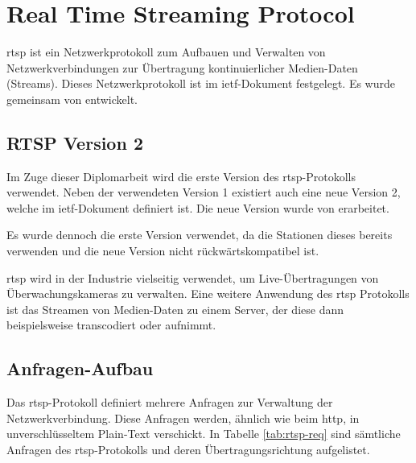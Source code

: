 \section{Real Time Streaming Protocol}
\ac{rtsp} ist ein Netzwerkprotokoll zum Aufbauen und Verwalten von Netzwerkverbindungen zur Übertragung kontinuierlicher Medien-Daten (Streams).
Dieses Netzwerkprotokoll ist im \ac{ietf}-Dokument  festgelegt. 
Es wurde gemeinsam von \citeauthor{ietf-rtsp} entwickelt. \cite[vgl.][]{ietf-rtsp}\par

\subsection{RTSP Version 2}
Im Zuge dieser Diplomarbeit wird die erste Version des \ac{rtsp}-Protokolls verwendet.
Neben der verwendeten Version 1 existiert auch eine neue Version 2, welche im \ac{ietf}-Dokument  definiert ist. Die neue Version wurde von \citeauthor{ietf-rtsp-2} erarbeitet. \cite[vgl.][]{ietf-rtsp-2}\par
Es wurde dennoch die erste Version verwendet, da die Stationen dieses bereits verwenden und die neue Version nicht rückwärtskompatibel ist.\par

\ac{rtsp} wird in der Industrie vielseitig verwendet, um Live-Übertragungen von Überwachungskameras zu verwalten. Eine weitere Anwendung des \ac{rtsp} Protokolls ist das Streamen von Medien-Daten zu einem Server, der diese dann beispielsweise transcodiert oder aufnimmt.

\subsection{Anfragen-Aufbau}
Das \ac{rtsp}-Protokoll definiert mehrere Anfragen zur Verwaltung der Netzwerkverbindung.
Diese Anfragen werden, ähnlich wie beim \ac{http}, in unverschlüsseltem Plain-Text verschickt.
In Tabelle \ref{tab:rtsp-req} sind sämtliche Anfragen des \ac{rtsp}-Protokolls und deren Übertragungsrichtung aufgelistet.

